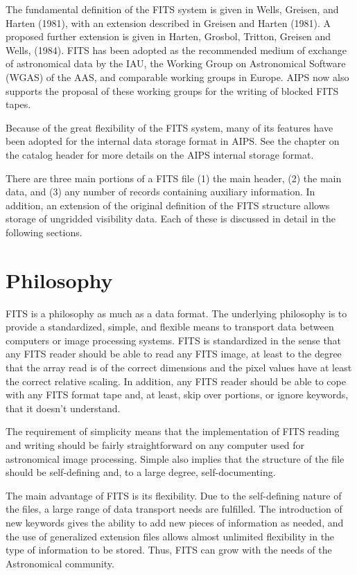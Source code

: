 The fundamental definition of the FITS system is
given in Wells, Greisen, and Harten (1981), with an extension
described in Greisen and Harten (1981).  A proposed further extension
is given in Harten, Grosbol, Tritton, Greisen and Wells, (1984).  FITS
has been adopted as the recommended medium of exchange of astronomical
data by the IAU, the Working Group on Astronomical Software (WGAS) of
the AAS, and comparable working groups in Europe.  AIPS now also
supports the proposal of these working groups for the writing of
blocked FITS tapes.

Because of the great flexibility of the FITS system, many of its
features have been adopted for the internal data storage format in
AIPS.  See the chapter on the catalog header for more details on the
AIPS internal storage format.

There are three main portions of a FITS file (1) the main header, (2)
the main data, and (3) any number of records containing auxiliary
information.  In addition, an extension of the original definition of
the FITS structure allows storage of ungridded visibility data.  Each
of these is discussed in detail in the following sections.

\section{Philosophy }
FITS is a philosophy as much as a data format.  The underlying
philosophy is to provide a standardized, simple, and flexible means to
transport data between computers or image processing systems. FITS is
standardized in the sense that any FITS reader should be able to read
any FITS image, at least to the degree that the array read is of the
correct dimensions and the pixel values have at least the correct
relative scaling.  In addition, any FITS reader should be able to cope
with any FITS format tape and, at least, skip over portions, or ignore
keywords, that it doesn't understand.

The requirement of simplicity means that the implementation of FITS
reading and writing should be fairly straightforward on any computer
used for astronomical image processing.  Simple also implies that the
structure of the file should be self-defining and, to a large degree,
self-documenting.

The main advantage of FITS is its flexibility.  Due to the
self-defining nature of the files, a large range of data transport
needs are fulfilled. The introduction of new keywords gives the
ability to add new pieces of information as needed, and the use of
generalized extension files allows almost unlimited flexibility in the
type of information to be stored.  Thus, FITS can grow with the needs
of the Astronomical community.

